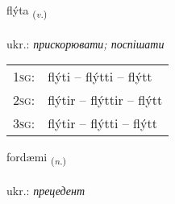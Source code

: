 \documentclass[frontgrid, backgrid]{flacards}\usepackage[]{graphicx}\usepackage[]{xcolor}
\begin{document}
\renewcommand{\flhead}{\vskip5pt \fboxsep=0pt {\small\bfseries\footnotesize Sagnorð | дієслово}}
\renewcommand{\fcfoot}{\vskip5pt \fboxsep=0pt \hspace{2pt}{\small\bfseries\footnotesize 3K}}

\renewcommand{\blhead}{\vskip5pt {\small\bfseries\footnotesize Sagnorð | дієслово }}
\renewcommand{\bcfoot}{\vskip5pt \hspace{2pt}{\small\bfseries\footnotesize 3K}}


{flýta \small{\textsubscript{(\textit{v.})}} \\[1ex] %
\textphonetic{[fliːta]} \\
ukr.: \emph{прискорювати; поспішати} \\  [2ex]
\renewcommand*{\arraystretch}{0.8}
\begin{tabular}{p{1cm}l}
\textsc{1sg}: & flýti -- flýtti -- flýtt \\ 
\textsc{2sg}: & flýtir -- flýttir -- flýtt \\ 
\textsc{3sg}: & flýtir -- flýtti -- flýtt \\ 
\end{tabular}
}

\renewcommand{\flhead}{\vskip5pt \fboxsep=0pt {\small\bfseries\footnotesize Nafnorð | іменник}}
\renewcommand{\fcfoot}{\vskip5pt \fboxsep=0pt \hspace{2pt}{\small\bfseries\footnotesize 3K}}

\renewcommand{\blhead}{\vskip5pt {\small\bfseries\footnotesize Nafnorð | іменник }}
\renewcommand{\bcfoot}{\vskip5pt \hspace{2pt}{\small\bfseries\footnotesize 3K}}


{fordæmi \small{\textsubscript{(\textit{n.})}} \\[1ex] %
\textphonetic{[fɔrtaimɪ]} \\
ukr.: \emph{прецедент} \\  [2ex]
\renewcommand*{\arraystretch}{0.8}
}
\end{document}
